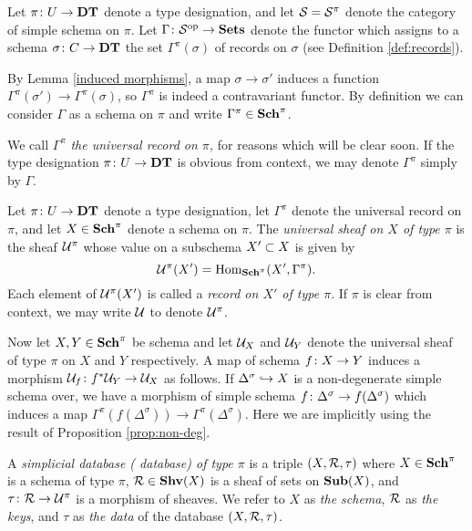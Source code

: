 \documentclass{amsart}
\def\DT{{\bf DT}}
\def\Sch{{\bf Sch}}
\def\Sub{{\bf Sub}}
\begin{document}
\begin{example}\label{ex:universal record}

Let $\pi\taking U\to\DT$ denote a type designation, and let $\mcS=\mcS^\pi$ denote the category of simple schema on $\pi$.  Let $\Gamma\taking\mcS\op\to\Sets$ denote the functor which assigns to a schema $\sigma\taking C\to\DT$ the set $\Gamma^\pi(\sigma)$ of records on $\sigma$ (see Definition \ref{def:records}).

By Lemma \ref{induced morphisms}, a map $\sigma\to\sigma'$ induces a function $\Gamma^\pi(\sigma')\to\Gamma^\pi(\sigma)$, so $\Gamma^\pi$ is indeed a contravariant functor.  By definition we can consider $\Gamma$ as a schema on $\pi$ and write $\Gamma^\pi\in\Sch^\pi$.

We call $\Gamma^\pi$ {\em the universal record on $\pi$,} for reasons which will be clear soon.  If the type designation $\pi\taking U\to\DT$ is obvious from context, we may denote $\Gamma^\pi$ simply by $\Gamma$.  

\end{example}


\begin{definition}\label{def:universal sheaf}

Let $\pi\taking U\to\DT$ denote a type designation, let $\Gamma^\pi$ denote the universal record on $\pi$, and let $X\in\Sch^\pi$ denote a schema on $\pi$.  The {\em universal sheaf on $X$ of type $\pi$} is the sheaf $\mcU^\pi$ whose value on a subschema $X'\ss X$ is given by $$\mcU^\pi(X')=\Hom_{\Sch^\pi}(X',\Gamma^\pi).$$  Each element of $\mcU^\pi(X')$ is called a {\em record on $X'$ of type $\pi$}.  If $\pi$ is clear from context, we may write $\mcU$ to denote $\mcU^\pi$.

Now let $X,Y\in\Sch^\pi$ be schema and let $\mcU_X$ and $\mcU_Y$ denote the universal sheaf of type $\pi$ on $X$ and $Y$ respectively.  A map of schema $f\taking X\to Y$ induces a morphism $\mcU_f\taking f^*\mcU_Y\to\mcU_X$ as follows.  If $\Delta^\sigma\inj X$ is a non-degenerate simple schema over, we have a morphism of simple schema $f\taking \Delta^\sigma\to f(\Delta^\sigma)$ which induces a map $\Gamma^\pi(f(\Delta^\sigma))\to\Gamma^\pi(\Delta^\sigma)$.  Here we are implicitly using the result of Proposition \ref{prop:non-deg}.

\end{definition}

\begin{definition}\label{def:database objects}

A {\em simplicial database ( database) of type $\pi$} is a triple $(X,\mcR,\tau)$ where $X\in\Sch^\pi$ is a schema of type $\pi$, $\mcR\in\Shv(X)$ is a sheaf of sets on $\Sub(X)$, and $\tau\taking\mcR\to\mcU^\pi$ is a morphism of sheaves.  We refer to $X$ as {\em the schema}, $\mcR$ as {\em the keys}, and $\tau$ as {\em the data} of the database $(X,\mcR,\tau)$.

\end{definition}
\end{document}
